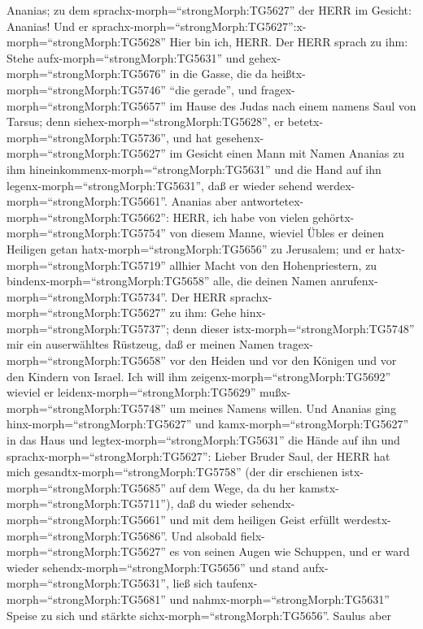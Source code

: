 Ananias; zu dem sprachx-morph=``strongMorph:TG5627'' der HERR im
Gesicht: Ananias! Und er
sprachx-morph=``strongMorph:TG5627'':x-morph=``strongMorph:TG5628'' Hier
bin ich, HERR.  Der HERR sprach zu ihm: Stehe
aufx-morph=``strongMorph:TG5631'' und gehex-morph=``strongMorph:TG5676''
in die Gasse, die da heißtx-morph=``strongMorph:TG5746'' ``die gerade'',
und fragex-morph=``strongMorph:TG5657'' im Hause des Judas nach einem
namens Saul von Tarsus; denn siehex-morph=``strongMorph:TG5628'', er
betetx-morph=``strongMorph:TG5736'',  und hat
gesehenx-morph=``strongMorph:TG5627'' im Gesicht einen Mann mit Namen
Ananias zu ihm hineinkommenx-morph=``strongMorph:TG5631'' und die Hand
auf ihn legenx-morph=``strongMorph:TG5631'', daß er wieder sehend
werdex-morph=``strongMorph:TG5661''.  Ananias aber
antwortetex-morph=``strongMorph:TG5662'': HERR, ich habe von vielen
gehörtx-morph=``strongMorph:TG5754'' von diesem Manne, wieviel Übles er
deinen Heiligen getan hatx-morph=``strongMorph:TG5656'' zu Jerusalem;
 und er hatx-morph=``strongMorph:TG5719'' allhier Macht von
den Hohenpriestern, zu bindenx-morph=``strongMorph:TG5658'' alle, die
deinen Namen anrufenx-morph=``strongMorph:TG5734''.  Der
HERR sprachx-morph=``strongMorph:TG5627'' zu ihm: Gehe
hinx-morph=``strongMorph:TG5737''; denn dieser
istx-morph=``strongMorph:TG5748'' mir ein auserwähltes Rüstzeug, daß er
meinen Namen tragex-morph=``strongMorph:TG5658'' vor den Heiden und vor
den Königen und vor den Kindern von Israel.  Ich will ihm
zeigenx-morph=``strongMorph:TG5692'' wieviel er
leidenx-morph=``strongMorph:TG5629'' mußx-morph=``strongMorph:TG5748''
um meines Namens willen.  Und Ananias ging
hinx-morph=``strongMorph:TG5627'' und kamx-morph=``strongMorph:TG5627''
in das Haus und legtex-morph=``strongMorph:TG5631'' die Hände auf ihn
und sprachx-morph=``strongMorph:TG5627'': Lieber Bruder Saul, der HERR
hat mich gesandtx-morph=``strongMorph:TG5758'' (der dir erschienen
istx-morph=``strongMorph:TG5685'' auf dem Wege, da du her
kamstx-morph=``strongMorph:TG5711''), daß du wieder
sehendx-morph=``strongMorph:TG5661'' und mit dem heiligen Geist erfüllt
werdestx-morph=``strongMorph:TG5686''.  Und alsobald
fielx-morph=``strongMorph:TG5627'' es von seinen Augen wie Schuppen, und
er ward wieder sehendx-morph=``strongMorph:TG5656''  und
stand aufx-morph=``strongMorph:TG5631'', ließ sich
taufenx-morph=``strongMorph:TG5681'' und
nahmx-morph=``strongMorph:TG5631'' Speise zu sich und stärkte
sichx-morph=``strongMorph:TG5656''. Saulus aber
